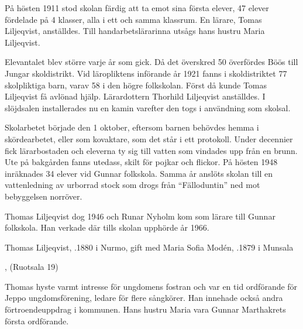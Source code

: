 På hösten 1911 stod skolan färdig att ta emot sina första elever, 47 elever fördelade på 4 klasser, alla i ett och samma klassrum. En lärare, Tomas Liljeqvist, anställdes. Till handarbetslärarinna utsågs hans hustru Maria Liljeqvist.

Elevantalet blev större varje år som gick. Då det överskred 50 överfördes Böös till Jungar skoldistrikt. Vid läropliktens införande år 1921 fanns i skoldistriktet 77 skolpliktiga barn, varav 58 i den högre folkskolan. Först då kunde Tomas Liljeqvist få avlönad hjälp. Lärardottern Thorhild Liljeqvist anställdes. I slöjdsalen installerades nu en kamin varefter den togs i användning som skolsal.

Skolarbetet började den 1 oktober, eftersom barnen behövdes hemma i skördearbetet, eller som kovaktare, som det står i ett protokoll. Under decennier fick lärarbostaden och eleverna ty sig till vatten som vindades upp från en brunn. Ute på bakgården fanns utedass, skilt för pojkar och flickor. På hösten 1948 inräknades 34 elever vid Gunnar folkskola. Samma år anslöts skolan till en vattenledning av urborrad stock som drogs från ``Fälloduntin'' ned mot bebyggelsen norröver.

Thomas Liljeqvist dog 1946 och Runar Nyholm kom som lärare till Gunnar folkskola. Han verkade där tills skolan upphörde år 1966.



Thomas Liljeqvist, .1880 i Nurmo, gift med Maria Sofia Modén,  .1879 i Munsala

\begin{jhchildren}
  \item {}
  \item {}
  \item {}
  \item {}
  \item {}, (Ruotsala 19)
\end{jhchildren}

Thomas hyste varmt intresse för ungdomens fostran och var en tid ordförande för Jeppo ungdomsförening, ledare för flere sångkörer. Han innehade också andra förtroendeuppdrag i kommunen. Hans hustru Maria vara Gunnar Marthakrets första ordförande.

